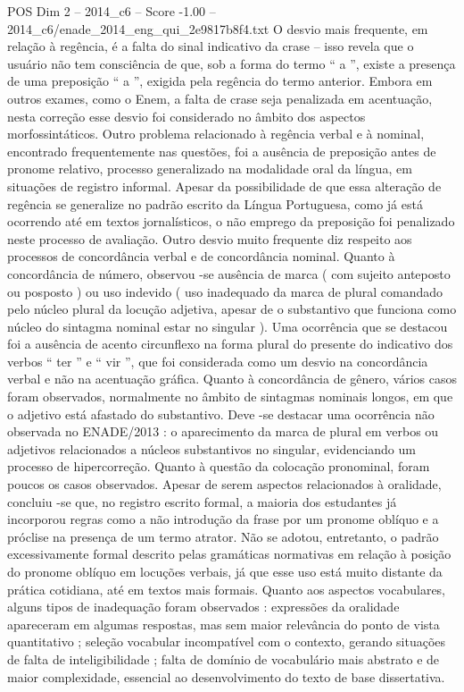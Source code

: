 \begin{textsample}{POS Dim 2 – 2014\_c6 – Score -1.00 – 2014\_c6/enade\_2014\_eng\_qui\_2e9817b8f4.txt}
O desvio mais frequente, em relação à regência, é a falta do sinal indicativo da crase – isso revela que o usuário não tem consciência de que, sob a forma do termo “ a ”, existe a presença de uma preposição “ a ”, exigida pela regência do termo anterior.
Embora em outros exames, como o Enem, a falta de crase seja penalizada em acentuação, nesta correção esse desvio foi considerado no âmbito dos aspectos morfossintáticos.
Outro problema relacionado à regência verbal e à nominal, encontrado frequentemente nas questões, foi a ausência de preposição antes de pronome relativo, processo generalizado na modalidade oral da língua, em situações de registro informal.
Apesar da possibilidade de que essa alteração de regência se generalize no padrão escrito da Língua Portuguesa, como já está ocorrendo até em textos jornalísticos, o não emprego da preposição foi penalizado neste processo de avaliação.
Outro desvio muito frequente diz respeito aos processos de concordância verbal e de concordância nominal.
Quanto à concordância de número, observou -se ausência de marca ( com sujeito anteposto ou posposto ) ou uso indevido ( uso inadequado da marca de plural comandado pelo núcleo plural da locução adjetiva, apesar de o substantivo que funciona como núcleo do sintagma nominal estar no singular ).
Uma ocorrência que se destacou foi a ausência de acento circunflexo na forma plural do presente do indicativo dos verbos “ ter ” e “ vir ”, que foi considerada como um desvio na concordância verbal e não na acentuação gráfica.
Quanto à concordância de gênero, vários casos foram observados, normalmente no âmbito de sintagmas nominais longos, em que o adjetivo está afastado do substantivo.
Deve -se destacar uma ocorrência não observada no ENADE/2013 : o aparecimento da marca de plural em verbos ou adjetivos relacionados a núcleos substantivos no singular, evidenciando um processo de hipercorreção.
Quanto à questão da colocação pronominal, foram poucos os casos observados.
Apesar de serem aspectos relacionados à oralidade, concluiu -se que, no registro escrito formal, a maioria dos estudantes já incorporou regras como a não introdução da frase por um pronome oblíquo e a próclise na presença de um termo atrator.
Não se adotou, entretanto, o padrão excessivamente formal descrito pelas gramáticas normativas em relação à posição do pronome oblíquo em locuções verbais, já que esse uso está muito distante da prática cotidiana, até em textos mais formais.
Quanto aos aspectos vocabulares, alguns tipos de inadequação foram observados : expressões da oralidade apareceram em algumas respostas, mas sem maior relevância do ponto de vista quantitativo ; seleção vocabular incompatível com o contexto, gerando situações de falta de inteligibilidade ; falta de domínio de vocabulário mais abstrato e de maior complexidade, essencial ao desenvolvimento do texto de base dissertativa.

\end{textsample}
